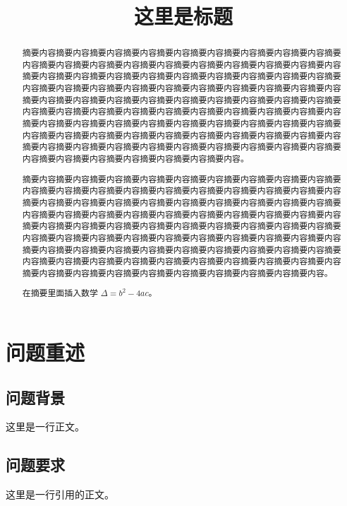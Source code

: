 \documentclass{cumcmthesis}
\title{这里是标题}
\begin{document}
\maketitle
\begin{abstract}
    摘要内容摘要内容摘要内容摘要内容摘要内容摘要内容摘要内容摘要内容摘要内容摘要内容摘要内容摘要内容摘要内容摘要内容摘要内容摘要内容摘要内容摘要内容摘要内容摘要内容摘要内容摘要内容摘要内容摘要内容摘要内容摘要内容摘要内容摘要内容摘要内容摘要内容摘要内容摘要内容摘要内容摘要内容摘要内容摘要内容摘要内容摘要内容摘要内容摘要内容摘要内容摘要内容摘要内容摘要内容摘要内容摘要内容摘要内容摘要内容摘要内容摘要内容摘要内容摘要内容摘要内容摘要内容摘要内容摘要内容摘要内容摘要内容摘要内容摘要内容摘要内容摘要内容摘要内容摘要内容摘要内容摘要内容摘要内容摘要内容摘要内容摘要内容摘要内容摘要内容摘要内容摘要内容摘要内容摘要内容摘要内容摘要内容摘要内容摘要内容摘要内容摘要内容摘要内容摘要内容摘要内容摘要内容摘要内容摘要内容摘要内容摘要内容摘要内容摘要内容。
    \par 摘要内容摘要内容摘要内容摘要内容摘要内容摘要内容摘要内容摘要内容摘要内容摘要内容摘要内容摘要内容摘要内容摘要内容摘要内容摘要内容摘要内容摘要内容摘要内容摘要内容摘要内容摘要内容摘要内容摘要内容摘要内容摘要内容摘要内容摘要内容摘要内容摘要内容摘要内容摘要内容摘要内容摘要内容摘要内容摘要内容摘要内容摘要内容摘要内容摘要内容摘要内容摘要内容摘要内容摘要内容摘要内容摘要内容摘要内容摘要内容摘要内容摘要内容摘要内容摘要内容摘要内容摘要内容摘要内容摘要内容摘要内容摘要内容摘要内容摘要内容摘要内容摘要内容摘要内容摘要内容摘要内容摘要内容摘要内容摘要内容摘要内容摘要内容摘要内容摘要内容摘要内容摘要内容摘要内容摘要内容摘要内容摘要内容摘要内容摘要内容摘要内容摘要内容摘要内容摘要内容摘要内容。
    \par 在摘要里面插入数学 $\Delta = b^2 - 4ac$。

\end{abstract}

\section{问题重述}
\subsection{问题背景}
这里是一行正文。
\subsection{问题要求}
这里是一行引用的正文。
\end{document}
